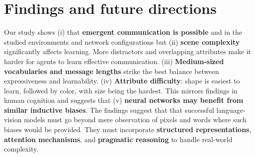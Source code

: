 \documentclass[11pt]{article}
\def\tightlist{} %
\begin{document}
\section{Findings and future directions}

Our study shows (i) that \textbf{emergent communication is possible}
and in the studied environments and network configurations but (ii)
\textbf{scene complexity} significantly affects learning. More
distractors and overlapping attributes make it harder for agents to
learn effective communication. (iii) \textbf{Medium-sized vocabularies
  and message lengths} strike the best balance between expressiveness
and learnability.
(iv) \textbf{Attribute difficulty}: shape is easiest to learn,
followed by color, with size being the hardest. This mirrors findings
in human cognition and suggests that (v) \textbf{neural networks may
  benefit from similar inductive biases}. The findings suggest that
that successful language-vision models must go beyond mere observation
of pixels and words where such biases would be provided. They must
incorporate \textbf{structured representations}, \textbf{attention
  mechanisms}, and \textbf{pragmatic reasoning} to handle real-world
complexity.




\end{document}
